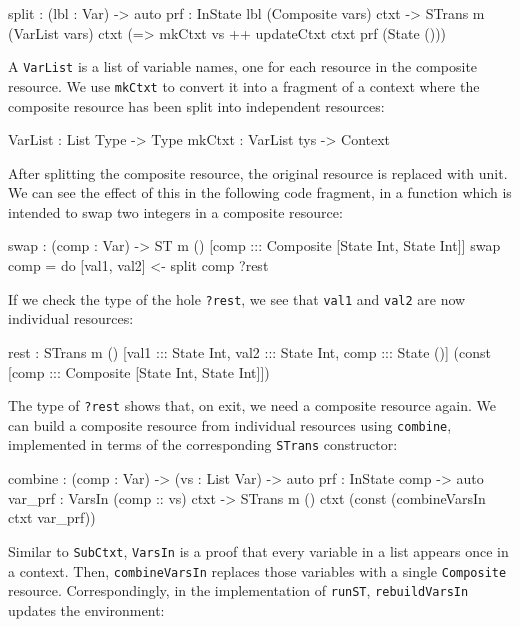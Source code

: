 \small
\begin{code}
split : (lbl : Var) -> {auto prf : InState lbl (Composite vars) ctxt} ->
        STrans m (VarList vars) ctxt 
                 (\vs => mkCtxt vs ++ updateCtxt ctxt prf (State ()))
\end{code}
\normalsize

A \texttt{VarList} is a list of variable names, one for each resource
in the composite resource. We use \texttt{mkCtxt} to convert it into
a fragment of a context where the composite resource has been split into
independent resources:
  
\small
\begin{code}
VarList : List Type -> Type
mkCtxt : VarList tys -> Context
\end{code}
\normalsize

After splitting the composite resource, the original resource is replaced with
unit. We can see the effect of this in the following code fragment,
in a function which is intended to swap two integers in a composite resource:

\small
\begin{code}
swap : (comp : Var) -> ST m () [comp ::: Composite [State Int, State Int]]
swap comp = do [val1, val2] <- split comp
               ?rest
\end{code}
\normalsize

If we check the type of the hole \texttt{?rest}, we see that \texttt{val1}
and \texttt{val2} are now individual resources:

\small
\begin{code}
rest : STrans m () [val1 ::: State Int, val2 ::: State Int, comp ::: State ()]
            (const [comp ::: Composite [State Int, State Int]])
\end{code}
\normalsize

The type of \texttt{?rest} shows that, on exit, we need a composite resource
again. We can build a composite resource from individual resources using
\texttt{combine}, implemented in terms of the corresponding \texttt{STrans}
constructor:

\small
\begin{code}
combine : (comp : Var) -> (vs : List Var) ->
          {auto prf : InState comp} -> {auto var_prf : VarsIn (comp :: vs) ctxt} ->
          STrans m () ctxt (const (combineVarsIn ctxt var_prf))
\end{code}
\normalsize

Similar to \texttt{SubCtxt}, \texttt{VarsIn} is a proof that every variable
in a list appears once in a context. Then, \texttt{combineVarsIn} replaces
those variables with a single \texttt{Composite} resource. Correspondingly,
in the implementation of \texttt{runST}, \texttt{rebuildVarsIn} updates the
environment:

